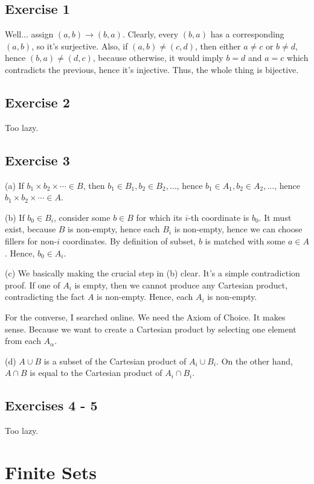 \documentclass{book}
\begin{document}
\subsection*{Exercise 1}
Well... assign $(a, b) \rightarrow (b, a)$. Clearly, every $(b, a)$ has a corresponding $(a, b)$, so it's surjective. Also, if $(a, b) \neq (c, d)$, then either $a \neq c$ or $b \neq d$, hence $(b, a) \neq (d, c)$, because otherwise, it would imply $b = d$ and $a = c$ which contradicts the previous, hence it's injective. Thus, the whole thing is bijective.

\subsection*{Exercise 2}
Too lazy.

\subsection*{Exercise 3}
(a)
If $b_1 \times b_2 \times \cdots \in B$, then $b_1 \in B_1, b_2 \in B_2, \ldots$, hence $b_1 \in A_1, b_2 \in A_2, \ldots$, hence $b_1 \times b_2 \times \cdots \in A$.

\noindent
(b)
If $b_0 \in B_i$, consider some $b \in B$ for which its $i$-th coordinate is $b_0$. It must exist, because $B$ is non-empty, hence each $B_i$ is non-empty, hence we can choose fillers for non-$i$ coordinates. By definition of subset, $b$ is matched with some $a \in A$. Hence, $b_0 \in A_i$.

\noindent
(c)
We basically making the crucial step in (b) clear. It's a simple contradiction proof. If one of $A_i$ is empty, then we cannot produce any Cartesian product, contradicting the fact $A$ is non-empty. Hence, each $A_i$ is non-empty.

For the converse, I searched online. We need the Axiom of Choice. It makes sense. Because we want to create a Cartesian product by selecting one element from each $A_\alpha$.

\noindent
(d)
$A \cup B$ is a subset of the Cartesian product of $A_i \cup B_i$. On the other hand, $A \cap B$ is equal to the Cartesian product of $A_i \cap B_i$.

\subsection*{Exercises 4 - 5}
Too lazy.

\section{Finite Sets}
\end{document}
